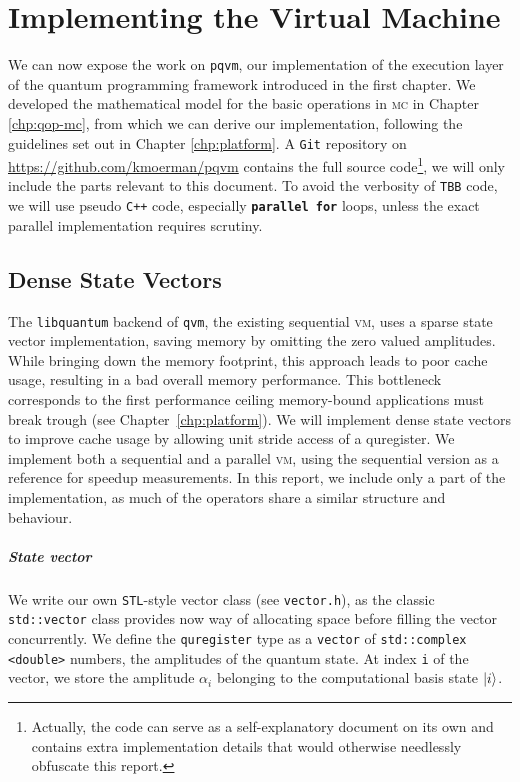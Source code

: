 \documentclass[a4paper,11pt, oneside]{report}
\newcommand{\code}[1]{\texttt{#1}}
\newcommand{\acro}[1]{\textsc{#1}}
\begin{document}
\chapter{Implementing the Virtual Machine}\label{chp:implementation}
We can now expose the work on \code{pqvm}, our implementation of the execution layer of the quantum programming framework introduced in the first chapter. We developed the mathematical model for the basic operations in \acro{mc} in Chapter \ref{chp:qop-mc}, from which we can derive our implementation, following the guidelines set out in Chapter \ref{chp:platform}. A \code{Git} repository on \url{https://github.com/kmoerman/pqvm} contains the full source code\footnote{Actually, the code can serve as a self-explanatory document on its own and contains extra implementation details that would otherwise needlessly obfuscate this report.}, we will only include the parts relevant to this document. To avoid the verbosity of \code{TBB} code, we will use pseudo \code{C++} code, especially \code{\bfseries parallel for} loops, unless the exact parallel implementation requires scrutiny.


\section{Dense State Vectors}
The \code{libquantum} backend of \code{qvm}, the existing sequential \acro{vm}, uses a sparse state vector implementation, saving memory by omitting the zero valued amplitudes. While bringing down the memory footprint, this approach leads to poor cache usage, resulting in a bad overall memory performance. This bottleneck corresponds to the first performance ceiling memory-bound applications must break trough (see Chapter~\ref{chp:platform}). We will implement dense state vectors to improve cache usage by allowing unit stride access of a quregister. We implement both a sequential and a parallel \acro{vm}, using the sequential version as a reference for speedup measurements. In this report, we include only a part of the implementation, as much of the operators share a similar structure and behaviour.


\paragraph{State vector} We write our own \code{STL}-style vector class (see \code{vector.h}), as the classic \code{std::vector} class provides now way of allocating space before filling the vector concurrently. We define the \code{quregister} type as a \code{vector} of \code{std::complex <double>} numbers, the amplitudes of the quantum state.
At index \code{i} of the vector, we store the amplitude $\alpha_i$ belonging to the computational basis state $\lvert i\rangle$.
\end{document}
